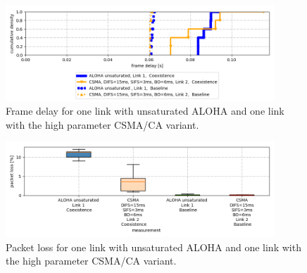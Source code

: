 \begin{figure}[tb]
	\label{fig:results-unsat-aloha-csma-frame-delay}
	\begin{center}
		\includegraphics[width=0.9\textwidth]{pictures/results/different_combinations/aloha_unsat_csma/frame_delay_cdf}
	\end{center}
	\caption{Frame delay for one link with unsaturated ALOHA and one link with the high parameter CSMA/CA variant.}
\end{figure}

\begin{figure}[tb]
	\label{fig:results-unsat-aloha-csma-packet-loss}
	\begin{center}
		\includegraphics[width=0.9\textwidth]{pictures/results/different_combinations/aloha_unsat_csma/packet_loss_boxplot}	
	\end{center}
	\caption{Packet loss for one link with unsaturated ALOHA and one link with the high parameter CSMA/CA variant.}
\end{figure}

